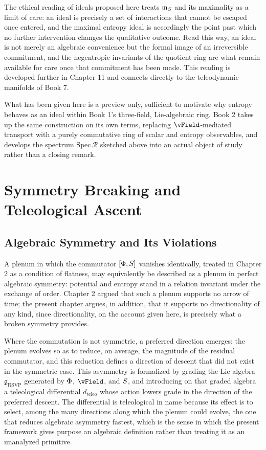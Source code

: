 The ethical reading of ideals proposed here treats $\mathfrak{m}_{S}$ and its maximality as a limit of care: an ideal is precisely a set of interactions that cannot be escaped once entered, and the maximal entropy ideal is accordingly the point past which no further intervention changes the qualitative outcome. Read this way, an ideal is not merely an algebraic convenience but the formal image of an irreversible commitment, and the negentropic invariants of the quotient ring are what remain available for care once that commitment has been made. This reading is developed further in Chapter 11 and connects directly to the teleodynamic manifolds of Book 7.

What has been given here is a preview only, sufficient to motivate why entropy behaves as an ideal within Book 1's three-field, Lie-algebraic ring. Book 2 takes up the same construction on its own terms, replacing $\vField$-mediated transport with a purely commutative ring of scalar and entropy observables, and develops the spectrum $\mathrm{Spec}\,\mathcal{R}$ sketched above into an actual object of study rather than a closing remark.

\part{Symmetry Breaking and Teleological Ascent}

\chapter{Algebraic Symmetry and Its Violations}

A plenum in which the commutator $[\Phi, S]$ vanishes identically, treated in Chapter 2 as a condition of flatness, may equivalently be described as a plenum in perfect algebraic symmetry: potential and entropy stand in a relation invariant under the exchange of order. Chapter 2 argued that such a plenum supports no arrow of time; the present chapter argues, in addition, that it supports no directionality of any kind, since directionality, on the account given here, is precisely what a broken symmetry provides.

Where the commutation is not symmetric, a preferred direction emerges: the plenum evolves so as to reduce, on average, the magnitude of the residual commutator, and this reduction defines a direction of descent that did not exist in the symmetric case. This asymmetry is formalized by grading the Lie algebra $\mathfrak{g}_{\mathrm{RSVP}}$ generated by $\Phi$, $\vField$, and $S$, and introducing on that graded algebra a teleological differential $d_{\text{teleo}}$ whose action lowers grade in the direction of the preferred descent. The differential is teleological in name because its effect is to select, among the many directions along which the plenum could evolve, the one that reduces algebraic asymmetry fastest, which is the sense in which the present framework gives purpose an algebraic definition rather than treating it as an unanalyzed primitive.

